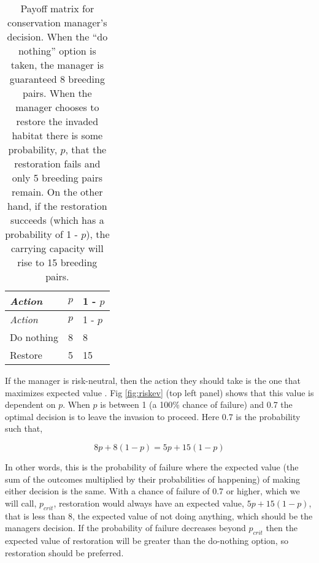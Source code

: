 \documentclass[]{article}
\theoremstyle{definition}
\theoremstyle{definition}
\theoremstyle{definition}
\theoremstyle{remark}
\begin{document}
\clearpage

\begin{longtable}[]{@{}lll@{}}
\caption{\label{tab:payoff} Payoff matrix for conservation manager's
decision. When the ``do nothing'' option is taken, the manager is
guaranteed 8 breeding pairs. When the manager chooses to restore the
invaded habitat there is some probability, \(p\), that the restoration
fails and only 5 breeding pairs remain. On the other hand, if the
restoration succeeds (which has a probability of 1 - \(p\)), the
carrying capacity will rise to 15 breeding pairs.}\tabularnewline
\toprule
\emph{Action} & \(p\) & 1 - \(p\)\tabularnewline
\midrule
\endfirsthead
\toprule
\emph{Action} & \(p\) & 1 - \(p\)\tabularnewline
\midrule
\endhead
Do nothing & 8 & 8\tabularnewline
Restore & 5 & 15\tabularnewline
\bottomrule
\end{longtable}

If the manager is risk-neutral, then the action they should take is the
one that maximizes expected value \citep{Burgman2005}. Fig
\ref{fig:riskev} (top left panel) shows that this value is dependent on
\(p\). When \(p\) is between 1 (a 100\% chance of failure) and 0.7 the
optimal decision is to leave the invasion to proceed. Here 0.7 is the
probability such that,

\begin{equation}
  8p + 8(1 - p) = 5p + 15(1 - p)
  \label{eq:pcrit}
\end{equation}

In other words, this is the probability of failure where the expected
value (the sum of the outcomes multiplied by their probabilities of
happening) of making either decision is the same. With a chance of
failure of 0.7 or higher, which we will call, \(p_\textit{crit}\),
restoration would always have an expected value, \(5p + 15(1 - p)\),
that is less than 8, the expected value of not doing anything, which
should be the managers decision. If the probability of failure decreases
beyond \(p_\textit{crit}\) then the expected value of restoration will
be greater than the do-nothing option, so restoration should be
preferred.
\end{document}
